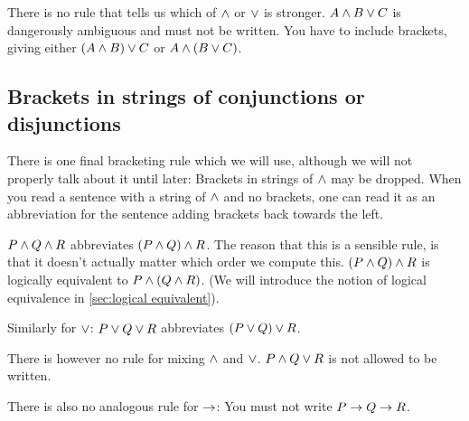 \smallskip  

There is no rule that tells us which of $\mathbin{\wedge}$ or $\vee$ is stronger. $A\mathbin{\wedge} B\vee C$ is dangerously ambiguous and must not be written. You have to include brackets, giving either $(A\mathbin{\wedge} B)\vee C$ or $A\mathbin{\wedge} (B\vee C)$. 

\subsection{Brackets in strings of conjunctions or disjunctions}
There is one final bracketing rule which we will use, although we will not properly talk about it until later: 
Brackets in strings of $\mathbin{\wedge}$ may be dropped. When you read a sentence with a string of $\mathbin{\wedge}$ and no brackets, one can read it as an abbreviation for the sentence adding brackets back towards the left. 

$P\mathbin{\wedge} Q\mathbin{\wedge} R$ abbreviates $(P\mathbin{\wedge} Q)\mathbin{\wedge} R$.
The reason that this is a sensible rule, is that it doesn't actually matter which order we compute this. $(P\mathbin{\wedge} Q)\mathbin{\wedge} R$ is logically equivalent to $P\mathbin{\wedge}(Q\mathbin{\wedge} R)$. (We will introduce the notion of logical equivalence in \cref{sec:logical equivalent}).

Similarly for $\vee$: 
$P\vee Q\vee R$ abbreviates $(P\vee Q)\vee R$. 

There is however no rule for mixing $\mathbin{\wedge}$ and $\vee$. 
$P\mathbin{\wedge} Q\vee R$ is not allowed to be written. 

There is also no analogous rule for $\rightarrow$: You must not write $P\rightarrow Q\rightarrow R$. 


